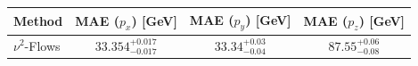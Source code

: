    \begin{tabular}{lccc}
        \toprule
        Method & MAE ($p_x$) [GeV] & MAE ($p_y$) [GeV] & MAE ($p_z$) [GeV] \\
        \midrule
        $\nu^2$-Flows & $33.354^{+0.017}_{-0.017}$ & $33.34^{+0.03}_{-0.04}$ & $87.55^{+0.06}_{-0.08}$ \\
        \bottomrule
    \end{tabular}